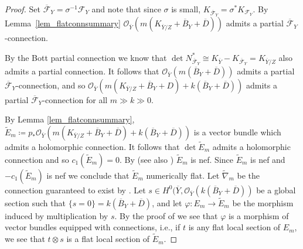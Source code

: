 \documentclass[12pt]{amsart}
\theoremstyle{plain}
\theoremstyle{definition}
\def\det{\operatorname{det}}
\begin{document}
\begin{proof}
Set $\overline{\mathcal F}_Y = \sigma^{-1}\mathcal F_Y$ and 
note that since $\sigma$ is small, $K_{\overline{\mathcal F}_Y} = \sigma^*K_{\mathcal F_Y}$.
By Lemma~\ref{lem_flatconnsummary} 
$\mathcal O_{\overline{Y}}(m(K_{\overline Y/Z}+\overline{B}_Y+\overline{D}))$ admits a partial 
$\overline{\mathcal F}_Y$-connection.

By the Bott partial connection we know that 
$\det N^*_{\overline{\mathcal F}_Y} \cong K_{\overline{Y}} - 
K_{\overline{\mathcal F}_Y} = K_{\overline{Y}/Z}$ 
also admits a partial connection.
It follows that $\mathcal O_{\overline{Y}}(m(\overline{B}_Y+\overline{D}))$ admits a partial $\overline{\mathcal F}_Y$-connection,
and so 
$\mathcal O_{\overline{Y}}(m(K_{\overline Y/Z}+\overline{B}_Y+D)+k(\overline{B}_Y+\overline{D}))$ 
admits a partial
$\overline{\mathcal F}_Y$-connection for all $m \gg k \gg 0$.

By Lemma \ref{lem_flatconnsummary}, 
$\tilde{E}_m \coloneqq p_*\mathcal O_{\overline{Y}}(m(K_{\overline Y/Z}+\overline{B}_Y+\overline{D})+k(\overline{B}_Y+\overline{D}))$
is a vector bundle which admits a holomorphic connection.  It follows that $\det \tilde{E}_m$ admits a holomorphic connection and so $c_1(\tilde{E}_m) = 0$.
By \cite[Corollary 4.5]{MR3294622} (see also \cite[Theorem 1.11]{MR3779955})  $\tilde{E}_m$ is nef. Since $\tilde{E}_m$ is nef and $-c_1( \tilde{E}_m)$ is nef we conclude that $\tilde{E}_m$ numerically flat.  
Let $\tilde{\nabla}_m$ be the connection guaranteed to exist by  
\cite[\S~3]{Simpson92}.  Let $s \in H^0(\overline{Y}, \mathcal O_{\overline{Y}}(k(\overline{B}_Y+\overline{D}))$ be a 
global section such that $\{s = 0\} = k(\overline{B}_Y+\overline{D})$, and let $\varphi\colon E_m \rightarrow \tilde{E}_m$
be the morphism induced by multiplication by $s$.  By the proof of \cite[Corollary 3.10]{Ou21}
we see that $\varphi$ is a morphism of vector bundles equipped with connections, i.e., if $t$ is any flat local section
of $E_m$, we see that $t\otimes s$ is a flat local section of $\tilde{E}_m$.


\end{proof}
\end{document}
